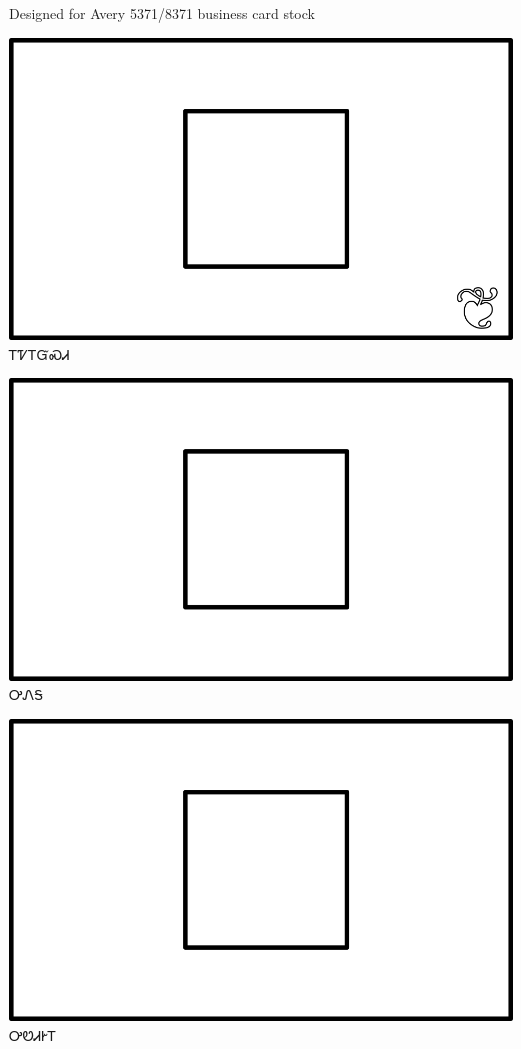 \documentclass[avery5371]{flashcards}%
\begin{document}
    Designed for Avery 5371/8371 business card stock


    \begin{flashcard}{
        \includegraphics[width=0.95\columnwidth,height=.51\columnwidth,keepaspectratio]{../artwork/for-colors/square-white-with-leaf}
    }
        \Huge ᎢᏤᎢᏳᏍᏗ
    \end{flashcard}

    \begin{flashcard}{
        \includegraphics[width=0.95\columnwidth,height=.51\columnwidth,keepaspectratio]{../artwork/for-colors/square-white}
    }
        \Huge ᎤᏁᎦ
    \end{flashcard}

    \begin{flashcard}{
        \includegraphics[width=0.95\columnwidth,height=.51\columnwidth,keepaspectratio]{../artwork/for-colors/square-white}
    }
        \Huge ᎤᏬᏗᎨᎢ
    \end{flashcard}
\end{document}
